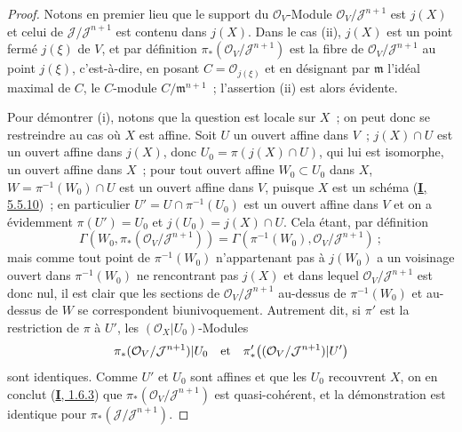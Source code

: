 \begin{proof}
Notons en premier lieu que le support du $\mathcal{O}_V$-Module
$\mathcal{O}_V/\mathcal{J}^{n+1}$ est $j(X)$ et celui de
$\mathcal{J}/\mathcal{J}^{n+1}$ est contenu dans $j(X)$. Dans le cas (ii),
$j(X)$ est un point fermé $j(\xi)$ de $V$,
et par définition $\pi_*(\mathcal{O}_V/\mathcal{J}^{n+1})$ est la fibre de
$\mathcal{O}_V/\mathcal{J}^{n+1}$ au point $j(\xi)$, c'est-à-dire, en posant
$C=\mathcal{O}_{j(\xi)}$ et en désignant par $\mathfrak{m}$ l'idéal maximal
de $C$, le $C$-module $C/\mathfrak{m}^{n+1}$~; l'assertion (ii) est alors
évidente.

Pour démontrer (i), notons que la question est locale sur $X$~; on peut donc
se restreindre au cas où $X$ est affine. Soit $U$ un ouvert affine dans $V$~;
$j(X)\cap U$ est un ouvert affine dans $j(X)$, donc
$U_0=\pi(j(X)\cap U)$, qui lui est isomorphe, un ouvert affine dans $X$~;
pour tout ouvert affine $W_0\subset U_0$ dans $X$,
$W=\pi^{-1}(W_0)\cap U$ est un ouvert affine dans $V$, puisque $X$ est un
schéma (\hyperref[I.5.5.10-fr]{\textbf{I}, 5.5.10})~; en particulier
$U'=U\cap\pi^{-1}(U_0)$ est un ouvert affine dans $V$ et on a évidemment
$\pi(U')=U_0$ et $j(U_0)=j(X)\cap U$. Cela étant, par définition
\[
  \Gamma(W_0,\pi_*(\mathcal{O}_V/\mathcal{J}^{n+1}))
  =\Gamma(\pi^{-1}(W_0),\mathcal{O}_V/\mathcal{J}^{n+1})~;
\]
mais comme tout point de $\pi^{-1}(W_0)$ n'appartenant pas à $j(W_0)$ a un
voisinage ouvert dans $\pi^{-1}(W_0)$ ne rencontrant pas $j(X)$ et dans
lequel $\mathcal{O}_V/\mathcal{J}^{n+1}$ est donc nul, il est clair que les
sections de $\mathcal{O}_V/\mathcal{J}^{n+1}$ au-dessus de $\pi^{-1}(W_0)$ et
au-dessus de $W$ se correspondent biunivoquement. Autrement dit, si $\pi'$ est
la restriction de $\pi$ à $U'$, les $(\mathcal{O}_X|U_0)$-Modules
\[
  \pi_*(\mathcal{O}_V/\mathcal{J}^{n+1})|U_0
  \quad\hbox{et}\quad
  \pi'_*\bigl((\mathcal{O}_V/\mathcal{J}^{n+1})|U'\bigr)
\]
sont identiques. Comme $U'$ et $U_0$ sont affines et que les $U_0$ recouvrent
$X$, on en conclut (\hyperref[I.1.6.3-fr]{\textbf{I}, 1.6.3}) que
$\pi_*(\mathcal{O}_V/\mathcal{J}^{n+1})$ est quasi-cohérent, et la
démonstration est identique pour
$\pi_*(\mathcal{J}/\mathcal{J}^{n+1})$.


\end{proof}
